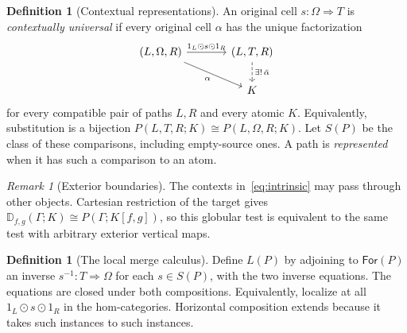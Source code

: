 \documentclass[11pt,a4paper]{article}
\theoremstyle{definition}
\newtheorem{definition}[theorem]{Definition}
\theoremstyle{remark}
\newtheorem{remark}[theorem]{Remark}
\numberwithin{equation}{section}
\newcommand{\D}{\mathbb D}
\newcommand{\cell}{\mathrel{\Longrightarrow}}
\newcommand{\wh}{\mathbin{\odot}}
\newcommand{\For}{\mathsf{For}}
\begin{document}
\begin{definition}[Contextual representations]\label{def:intrinsic}
An original cell $s:\Omega\cell T$ is \emph{contextually universal} if
every original cell $\alpha$ has the unique factorization
\begin{equation}\label{eq:intrinsic}
\begin{tikzcd}[column sep=large]
(L,\Omega,R) \arrow[r,"1_L\wh s\wh1_R"] \arrow[dr,"\alpha"'] &
(L,T,R) \arrow[d,dashed,"\exists!\,\bar\alpha"]\\
& K
\end{tikzcd}
\end{equation}
for every compatible pair of paths $L,R$ and every atomic $K$.
Equivalently, substitution is a bijection
$P(L,T,R;K)\cong P(L,\Omega,R;K)$.
Let $S(P)$ be the class of these comparisons, including empty-source ones.
A path is \emph{represented} when it has such a comparison to an atom.
\end{definition}

\begin{remark}[Exterior boundaries]
The contexts in~\eqref{eq:intrinsic} may pass through other objects.
Cartesian restriction of the target gives
$\D_{f,g}(\Gamma;K)\cong P(\Gamma;K[f,g])$, so this globular test is
equivalent to the same test with arbitrary exterior vertical maps.
\end{remark}

\begin{definition}[The local merge calculus]\label{def:localization}
Define $L(P)$ by adjoining to $\For(P)$ an inverse
$s^{-1}:T\cell\Omega$ for each $s\in S(P)$, with the two inverse
equations. The equations are closed under both compositions. Equivalently,
localize at all $1_L\wh s\wh1_R$ in the hom-categories. Horizontal
composition extends because it takes such instances to such instances.
\end{definition}
\end{document}
